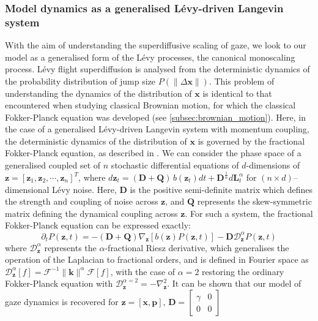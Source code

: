 \subsubsection*{Model dynamics as a generalised Lévy-driven Langevin system}
With the aim of understanding the superdiffusive scaling of gaze, we look to our model as a generalised form of the Lévy processes, the canonical monoscaling process. Lévy flight superdiffusion is analysed from the deterministic dynamics of the probability distribution of jump size $P(\| \Delta \textbf{x} \|)$. This problem of understanding the dynamics of the distribution of $\textbf{x}$ is identical to that encountered when studying classical Brownian motion, for which the classical Fokker-Planck equation was developed (see \ref{subsec:brownian_motion}). Here, in the case of a generalised Lévy-driven Langevin system with momentum coupling, the deterministic dynamics of the distribution of $\textbf{x}$ is governed by the fractional Fokker-Planck equation, as described in \cite{barkai_fractional_2001, qi_fractional_2022, ijcai2018p419}. We can consider the phase space of a generalised coupled set of $n$ stochastic differential equations of $d$-dimensions of $\mathbf{z}=[\mathbf{z}_1, \mathbf{z}_2, \cdots, \mathbf{z}_n]^T$, where $d\mathbf{z}_t = (\mathbf{D} + \mathbf{Q}) \, b(\mathbf{z}_t)dt + \mathbf{D}^{\frac{1}{\alpha}} d\mathbf{L}^{\alpha}_t$ for $(n \times d)$--dimensional Lévy noise. Here, $\mathbf{D}$ is the positive semi-definite matrix which defines the strength and coupling of noise across $\mathbf{z}$, and $\mathbf{Q}$ represents the skew-symmetric matrix defining the dynamical coupling across $\mathbf{z}$. For such a system, the fractional Fokker-Planck equation can be expressed exactly:
\begin{equation}\label{eq:fractional_fokker_planck}
    \partial_t P(\mathbf{z}, t) = - (\mathbf{D} + \textbf{Q}) \nabla_\mathbf{z} \left[ b(\mathbf{z}) P(\mathbf{z}, t)\right] - \mathbf{D} \mathcal{D}_{\mathbf{z}}^{\alpha} P(\mathbf{z}, t)
\end{equation}
where $\mathcal{D}^{\alpha}_{\mathbf{z}}$ represents the $\alpha$-fractional Riesz derivative, which generalises the operation of the Laplacian to fractional orders, and is defined in Fourier space as $\mathcal{D}^{\alpha}_{\mathbf{z}}[f] = \mathcal{F}^{-1} \|\textbf{k}\|^{\alpha} \mathcal{F}[f]$, with the case of $\alpha = 2$ restoring the ordinary Fokker-Planck equation with $\mathcal{D}^{\alpha = 2}_{\mathbf{z}} = -\nabla_{\mathbf{z}}^2$. It can be shown that our model of gaze dynamics is recovered for $\mathbf{z} = [\textbf{x}, \textbf{p}]$, $\mathbf{D} = \begin{bmatrix}
\gamma & 0\\
0 & 0
\end{bmatrix}$ 
